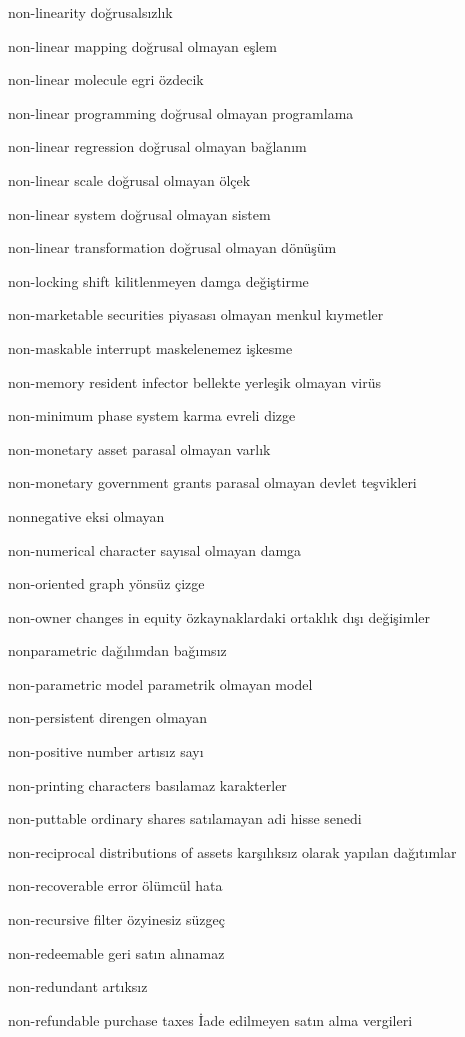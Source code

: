 \documentclass[12pt,fleqn]{article}\usepackage{../../common}
\begin{document}
non-linearity doğrusalsızlık

non-linear mapping doğrusal olmayan eşlem

non-linear molecule egri özdecik

non-linear programming doğrusal olmayan programlama

non-linear regression doğrusal olmayan bağlanım

non-linear scale doğrusal olmayan ölçek

non-linear system doğrusal olmayan sistem

non-linear transformation doğrusal olmayan dönüşüm

non-locking shift kilitlenmeyen damga değiştirme

non-marketable securities piyasası olmayan menkul kıymetler

non-maskable interrupt maskelenemez işkesme

non-memory resident infector bellekte yerleşik olmayan virüs

non-minimum phase system karma evreli dizge

non-monetary asset parasal olmayan varlık

non-monetary government grants parasal olmayan devlet teşvikleri

nonnegative eksi olmayan

non-numerical character sayısal olmayan damga

non-oriented graph yönsüz çizge

non-owner changes in equity özkaynaklardaki ortaklık dışı değişimler

nonparametric dağılımdan bağımsız

non-parametric model parametrik olmayan model

non-persistent direngen olmayan

non-positive number artısız sayı

non-printing characters basılamaz karakterler

non-puttable ordinary shares satılamayan adi hisse senedi

non-reciprocal distributions of assets karşılıksız olarak yapılan dağıtımlar

non-recoverable error ölümcül hata

non-recursive filter özyinesiz süzgeç

non-redeemable geri satın alınamaz

non-redundant artıksız

non-refundable purchase taxes İade edilmeyen satın alma vergileri
\end{document}
